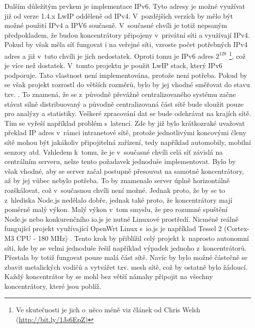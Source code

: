 Dalším důležitým prvkem je implementace IPv6.  Tyto adresy je možné využívat již od verze 1.4.x LwIP odděleně od IPv4. V~pozdějších verzích by mělo být možné použití IPv4 a IPV6 současně.  V~současné chvíli je totiž nepsaným předpokladem, že budou koncentrátory připojeny v~privátní síti a využívají IPv4.  Pokud by však měla síť fungovat i na veřejné síti, vzroste počet potřebných IPv4 adres a již v~tuto chvíli je jich nedostatek. Oproti tomu je IPv6 adres $2^{128}$ \cite{ripe}\footnote{Ve skutečnosti je jich o~něco méně viz článek od Chris Welsh  (\url{http://bit.ly/1Js6EpZ)}}, což je více než dostatek. V~tomto projektu je použit LwIP stack, který IPv6 podporuje. Tato vlastnost není implementována, protože není potřeba. Pokud by se však projekt rozrostl do větších rozměrů, bylo by jej vhodné směřovat do stavu tzv. .  To znamená, že se z~původně převážně centralizovaného systému začne stávat silně distribuovaný a původně centralizovaná část sítě bude sloužit pouze pro analýzy a statistiky. Veškeré zpracování dat se bude odehrávat na krajích sítě. Tím se vyřeší například problém s~latencí. Zde by již bylo krátkozraké uvažovat překlad IP adres v~rámci intranetové sítě, protože jednotlivými koncovými členy sítě mohou být jakákoliv připojitelná zařízení, tedy například automobily, mobilní senzory atd. Vzhledem k~tomu, že je v~současné chvíli celá síť závislá na centrálním serveru, nelze tento požadavek jednoduše implementovat. Bylo by však vhodné, aby se server začal postupně přesouvat na samotné koncentrátory, až by jej vůbec nebylo potřeba. To by znamenalo server úplně horizontálně rozškálovat, což v~současnou chvíli není možné. Jednak proto, že by se to z~hlediska Node.js  nedělalo dobře, jednak také proto, že koncentrátory mají poměrně malý výkon. Malý výkon v~tom smyslu, že pro rozumné spuštění Node.js nebo konkurenčního io.js je nutné Linuxové prostředí. Nicméně reálně fungující projekt využívající OpenWrt Linux \cite{openwrt} s~io.js je například Tessel 2 (Cortex\texttrademark-M3 CPU - 180 MHz) \cite{tessel}.  Tento krok by přiblížil celý projekt k~naprosto autonomní síti, kde by se velmi jednoduše řešil například výpadek jednoho z~koncentrátorů. Přestala by totiž fungovat pouze malá část sítě. Navíc by bylo možné částečně se zbavit metalických vodičů a vytvářet tzv. mesh sítě, což by ostatně bylo žádoucí. Každý koncentrátor by se mohl bez větší námahy připojit na všechny koncentrátory, které jsou poblíž.

